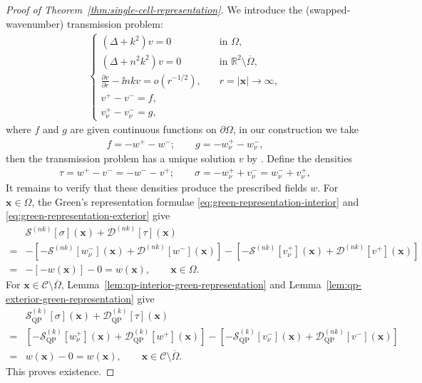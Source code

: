 \begin{proof}[Proof of Theorem~\ref{thm:single-cell-representation}]
We introduce the (swapped-wavenumber) transmission problem: \begin{align}
  \begin{cases}
  (\Delta + k^2) v = 0& \quad \text{in } \Omega,\\
  (\Delta + n^2k^2) v = 0& \quad \text{in } \mathbb{R}^2 \setminus \overline{\Omega},\\
  \frac{\partial v}{\partial r} - \ii n k v = o(r^{-1/2}),& \quad r = |\mathbf{x}| \to \infty,\\
  v^+ - v^- = f,&\\
  v_\nu^+ - v_\nu^- = g,&
  \end{cases}
  \label{eq:swapped-transmission-problem}
\end{align}
where $f$ and $g$ are given continuous functions on $\partial \Omega$, in our construction 
we take
\begin{align*}
  f = -w^+ - w^-; \qquad g = -w_\nu^+ - w_\nu^-,
\end{align*}
then the transmission problem has a unique solution $v$ by \cite[Theorem~3.41]{ColtonKress1983}.
Define the densities\begin{align*}
  \tau = w^+ - v^- = -w^- - v^+;\qquad \sigma = -w^+_\nu + v_\nu^- = w^-_\nu + v_\nu^+,
\end{align*}
It remains to verify that these densities produce the prescribed fields $w$. 
For $\mathbf{x} \in \Omega$, the Green's representation formulae \eqref{eq:green-representation-interior} and \eqref{eq:green-representation-exterior} give
\begin{align*}
  &\mathcal{S}^{(nk)}[\sigma](\mathbf{x}) + \mathcal{D}^{(nk)}[\tau](\mathbf{x})\\
  ={}& -\left[ -\mathcal{S}^{(nk)}[w_\nu^-](\mathbf{x}) + \mathcal{D}^{(nk)}[w^-](\mathbf{x}) \right] - \left[ -\mathcal{S}^{(nk)}[v_\nu^+](\mathbf{x}) + \mathcal{D}^{(nk)}[v^+](\mathbf{x}) \right]\\
  ={}& -[-w(\mathbf{x})] - 0 = w(\mathbf{x}), \qquad \mathbf{x} \in \Omega.
\end{align*}
For $\mathbf{x} \in \mathcal{C} \setminus \overline{\Omega}$, Lemma~\ref{lem:qp-interior-green-representation} and Lemma~\ref{lem:qp-exterior-green-representation} give
\begin{align*}
  &\mathcal{S}^{(k)}_\mathrm{QP}[\sigma](\mathbf{x}) + \mathcal{D}^{(k)}_\mathrm{QP}[\tau](\mathbf{x})\\
  ={}& \left[ -\mathcal{S}^{(k)}_\mathrm{QP}[w_\nu^+](\mathbf{x}) + \mathcal{D}^{(k)}_\mathrm{QP}[w^+](\mathbf{x}) \right] - \left[ -\mathcal{S}^{(k)}_\mathrm{QP}[v_\nu^-](\mathbf{x}) + \mathcal{D}^{(nk)}_\mathrm{QP}[v^-](\mathbf{x}) \right]\\
  ={}& w(\mathbf{x}) - 0 = w(\mathbf{x}), \qquad \mathbf{x} \in \mathcal{C} \setminus \overline{\Omega}.
\end{align*}
This proves existence.


\end{proof}
